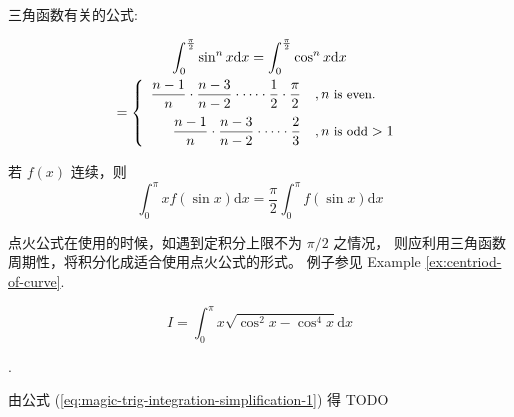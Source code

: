 三角函数有关的公式:
\begin{lemma}[点火公式]
    \begin{multline}\label{eq:launching-formula}
        \int_0^{\frac{\pi}{2}} \sin ^n x \mathrm{d} x = \int_0^{\frac{\pi}{2}} \cos ^n x \mathrm{d} x \\
        = 
        \left\{ 
            \begin{array}{rl}
                \dfrac{n - 1}{n} \cdot \dfrac{n - 3}{n - 2} \cdot \cdots \cdot \dfrac{1}{2} \cdot \dfrac{\pi}{2} &, n \mbox{\small \ is even.}   \\[1em]
                \dfrac{n - 1}{n} \cdot \dfrac{n - 3}{n - 2} \cdot \cdots \cdot \dfrac{2}{3}                      &, n \mbox{\small \ is odd} > 1 \\
            \end{array}
        \right.
    \end{multline}

    若 $f(x)$ 连续，则
    \begin{equation}
        \label{eq:magic-trig-integration-simplification-1}
        \int_0^{\pi} x f(\sin x) \mathrm{d} x = \dfrac{\pi}{2} \int_0^{\pi} f(\sin x) \mathrm{d} x
    \end{equation}
\end{lemma}

点火公式在使用的时候，如遇到定积分上限不为 $\pi/2$ 之情况，
则应利用三角函数周期性，将积分化成适合使用点火公式的形式。
例子参见 Example \ref{ex:centriod-of-curve}.

\begin{example}
    \[
        I = \int_0^{\pi} x \sqrt{\cos^2 x - \cos^4 x} \mathrm dx
    \]

    \cite[question 187]{w660}.

    由公式 (\ref{eq:magic-trig-integration-simplification-1}) 得
    TODO %
\end{example}

